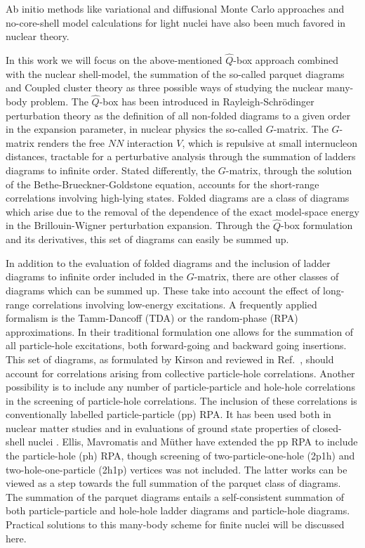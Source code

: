 \documentclass{article}
\begin{document}
Ab initio methods like variational and diffusional Monte Carlo approaches 
\cite{vijay,ndrops97,bob1,bob2,bob3} and no-core-shell model calculations 
\cite{bruce1,bruce2,bruce3,bruce4} for light nuclei
have also been much favored
in nuclear theory.

In this work we will focus on the above-mentioned $\hat{Q}$-box approach combined with the 
nuclear shell-model,
the summation of the so-called parquet diagrams and Coupled cluster theory as three
possible ways of studying the nuclear many-body problem.
The
$\hat{Q}$-box has been introduced in Rayleigh-Schr\"odinger perturbation
theory as the definition of all non-folded diagrams to a given order in
the expansion parameter, in nuclear physics the so-called $G$-matrix.
The $G$-matrix renders the free $NN$  interaction $V$, which
is repulsive at small internucleon distances,  tractable
for a perturbative analysis through the summation of ladders diagrams
to infinite order. Stated differently, the $G$-matrix, through the
solution of the Bethe-Brueckner-Goldstone equation, accounts for the
short-range correlations involving high-lying states.
Folded diagrams are a class of diagrams which arise
due to the removal of the dependence of the exact model-space energy
in the Brillouin-Wigner perturbation expansion. Through the $\hat{Q}$-box
formulation and its derivatives, this set of diagrams can easily be summed
up.

In addition to the evaluation of folded diagrams and the inclusion
of ladder diagrams to infinite order included in the $G$-matrix, there
are other classes of diagrams which can be summed up.
These take into account
the effect of long-range correlations involving low-energy excitations.
A frequently applied formalism is
the Tamm-Dancoff (TDA) or the random-phase
(RPA) approximations. In their traditional formulation one allows
for the summation of all particle-hole excitations, both forward-going
and backward going insertions.
This set of diagrams, as formulated by Kirson \cite{kirson74} and reviewed
in Ref.\ \cite{eo77}, should account for correlations  arising
from collective particle-hole correlations. Another possibility
is to include any number of particle-particle and hole-hole
correlations in the screening of particle-hole correlations.
The inclusion of these correlations is conventionally labelled
particle-particle (pp) RPA. It has been used both in nuclear matter
studies \cite{angels88,rpd89,yhk86,syk87}
and in evaluations of ground state properties of closed-shell
nuclei \cite{hmtk87,emm91,hmm95}.
Ellis, Mavromatis and M\"uther \cite{emm91,hmm95} have
extended the pp RPA to include the particle-hole (ph) RPA, though
screening of two-particle-one-hole (2p1h) and two-hole-one-particle
(2h1p) vertices was not included.
The latter works can be viewed as a step towards the full summation of the
parquet class of diagrams.
The summation of the parquet diagrams entails a self-consistent
summation of both particle-particle and hole-hole ladder diagrams
and particle-hole diagrams. Practical solutions to this many-body
scheme for finite nuclei will be discussed here.
\end{document}
